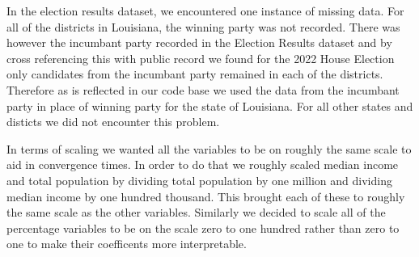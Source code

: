 \documentclass[12pt]{article}
\newcommand{\blue}[1]{\textcolor{blue}{#1}}
\begin{document}
In the election results dataset, we encountered one instance of missing data. For all of the districts in Louisiana, the winning party was not recorded. There was however the incumbant party recorded  in the Election Results dataset and by cross referencing this with public record we found for the 2022 House Election only candidates from the incumbant party remained in each of the districts. Therefore as is reflected in our code base we used the data from the incumbant party in place of winning party for the state of Louisiana. For all other states and disticts we did not encounter this problem. 

In terms of scaling we wanted all the variables to be on roughly the same scale to aid in convergence times. In order to do that we roughly scaled median income and total population by dividing total population by one million and dividing median income by one hundred thousand. This brought each of these to roughly the same scale as the other variables. Similarly we decided to scale all of the percentage variables to be on the scale zero to one hundred rather than zero to one to make their coefficents more interpretable.  





\end{document}
